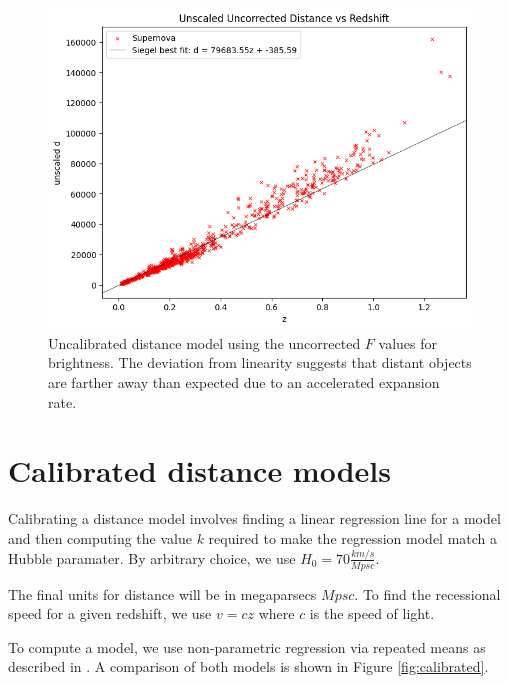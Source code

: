 \documentclass{article}
\begin{document}
\begin{figure}[h!]
  \includegraphics[width=\linewidth]{../graphs/uncorrected_uncalibrated.png}
  \caption{Uncalibrated distance model using the uncorrected $F$ values for brightness.
  The deviation from linearity suggests that distant objects are
  farther away than expected due to an accelerated expansion rate.}
  \label{fig:uncorrected_uncalibrated}
\end{figure}

\section{Calibrated distance models}
\label{sec:calibrated}

Calibrating a distance model involves finding a linear regression line for a
model and then computing the value $k$ required to make the regression model
match a Hubble paramater. By arbitrary choice, we use $H_0 = 70 \frac{km/s}{Mpsc}$.

The final units for distance will be in megaparsecs $Mpsc$. To find the
recessional speed for a given redshift, we use $v = cz$ where $c$ is the speed
of light.

To compute a model, we use non-parametric regression via repeated means as described in
\citet{siegel1982}. A comparison of both models is shown in Figure \ref{fig:calibrated}.
\end{document}

